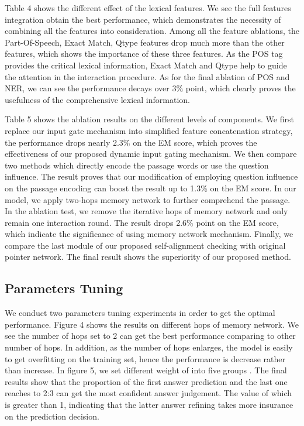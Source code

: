 \documentclass[letterpaper]{article} \usepackage{aaai18}  \usepackage{times}  \usepackage{helvet}  \usepackage{courier}  \usepackage{url}  \usepackage{graphicx}  \usepackage{booktabs}
\begin{document}
Table 4 shows the different effect of the lexical features. We see the full features integration obtain the best performance, which demonstrates the necessity of combining all the features into consideration. Among all the feature ablations, the Part-Of-Speech, Exact Match, Qtype features drop much more than the other features, which shows the importance of these three features. As the POS tag provides the critical lexical information, Exact Match and Qtype help to guide the attention in the interaction procedure. As for the final ablation of POS and NER, we can see the performance decays over 3\% point, which clearly proves the usefulness of the comprehensive lexical information.   

Table 5 shows the ablation results on the different levels of components. We first replace our input gate mechanism into simplified feature concatenation strategy, the performance drops nearly 2.3\% on the EM score, which proves the effectiveness of our proposed dynamic input gating mechanism. We then compare two methods which directly encode the passage words or use the question influence. The result proves that our modification of employing question influence on the passage encoding can boost the result up to 1.3\% on the EM score. In our model, we apply two-hops memory network to further comprehend the passage. In the ablation test, we remove the iterative hops of memory network and only remain one interaction round. The result drops 2.6\% point on the EM score, which indicate the significance of using memory network mechanism. Finally, we compare the last module of our proposed self-alignment checking with original pointer network. The final result shows the superiority of our proposed method.

\subsection{Parameters Tuning}
We conduct two parameters tuning experiments in order to get the optimal performance. Figure 4 shows the results on different hops of memory network. We see the number of hops set to 2 can get the best performance comparing to other number of hops. In addition, as the number of hops enlarges, the model is easily to get overfitting on the training set, hence the performance is decrease rather than increase. In figure 5, we set different weight of  into five groups . The final results show that the proportion of the first answer prediction and the last one reaches to 2:3 can get the most confident answer judgement. The value of  which is greater than 1, indicating that the latter answer refining takes more insurance on the prediction decision.
\end{document}

